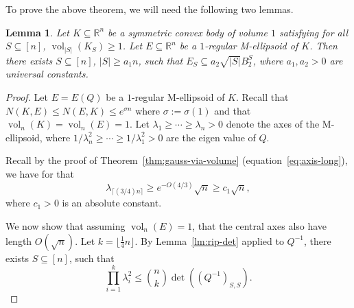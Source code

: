 \documentclass[11pt]{article}
\newtheorem{lemma}[theorem]{Lemma}
\newcommand{\ceil}[1]{\lceil #1 \rceil}
\newcommand{\floor}[1]{\lfloor #1 \rfloor}
\newcommand{\R}{{\mathbb{R}}}
\DeclareMathOperator{\vol}{vol}
\begin{document}
To prove the above theorem, we will need the following two lemmas.  
\begin{lemma}
\label{lem:axis-m-ell}
Let $K \subseteq \R^n$ be a symmetric convex body of volume $1$ satisfying for
all $S \subseteq [n]$, $\vol_{|S|}(K_S) \geq 1$. Let $E \subseteq \R^n$ be a
$1$-regular M-ellipsoid of $K$. Then there exists $S \subseteq [n]$, $|S| \geq
a_1 n$, such that $E_S \subseteq a_2 \sqrt{|S|} B_2^S$, where $a_1,a_2 > 0$ are
universal constants.
\end{lemma}
\begin{proof}
Let $E = E(Q)$ be a $1$-regular M-ellipsoid of $K$. Recall that $N(K,E) \leq
N(E,K) \leq e^{\sigma n}$ where $\sigma := \sigma(1)$ and that
$\vol_n(K)=\vol_n(E)=1$. Let $\lambda_1 \geq \cdots \geq \lambda_n > 0$ denote
the axes of the M-ellipsoid, where $1/\lambda_n^2 \geq \cdots \geq 1/\lambda^2_1
> 0$ are the eigen value of $Q$.

Recall by the proof of Theorem~\ref{thm:gauss-via-volume}
(equation~\eqref{eq:axis-long}), we have for that 
\begin{equation}
\label{eq:axes-long}
\lambda_{\ceil{(3/4)n}} \geq e^{-O(4/3)}\sqrt{n} \geq c_1 \sqrt{n}, 
\end{equation}
where $c_1 > 0$ is an absolute constant. 

We now show that assuming $\vol_n(E)=1$, that the central axes also have length
$O(\sqrt{n})$. Let $k = \floor{\frac{1}{4} n}$. By Lemma~\ref{lm:rip-det}
applied to $Q^{-1}$, there exists $S \subseteq [n]$, such that
\begin{equation}
\label{eq:short-axes}
\prod_{i=1}^k \lambda_i^2 \leq \binom{n}{k} \det((Q^{-1})_{S,S}). 
\end{equation}


\end{proof}
\end{document}
